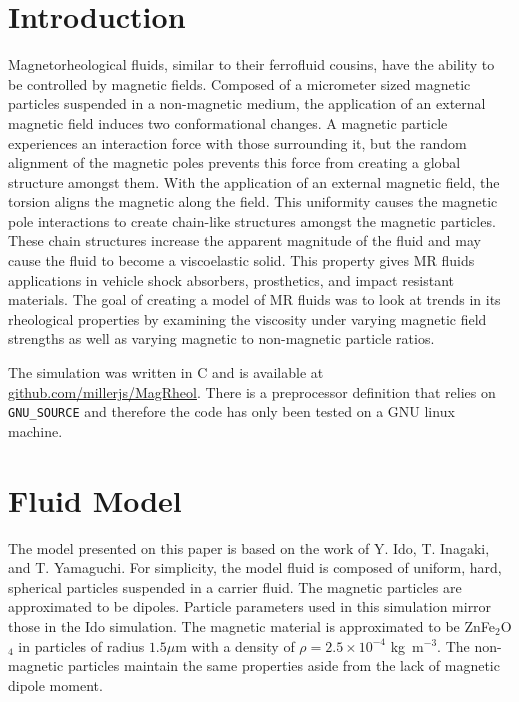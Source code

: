 \begin{multicols*}{2}

\section*{Introduction}

Magnetorheological fluids, similar to their ferrofluid cousins, have
the ability to be controlled by magnetic fields. Composed of a
micrometer sized magnetic particles suspended in a non-magnetic
medium, the application of an external magnetic field induces two
conformational changes. A magnetic particle experiences an interaction
force with those surrounding it, but the random alignment of the
magnetic poles prevents this force from creating a global structure
amongst them. With the application of an external magnetic field, the
torsion aligns the magnetic along the field.  This uniformity causes
the magnetic pole interactions to create chain-like structures amongst
the magnetic particles. These chain structures increase the apparent
magnitude of the fluid and may cause the fluid to become a
viscoelastic solid.  This property gives MR fluids applications in
vehicle shock absorbers, prosthetics, and impact resistant
materials. The goal of creating a model of MR fluids was to look at
trends in its rheological properties by examining the viscosity under
varying magnetic field strengths as well as varying magnetic to
non-magnetic particle ratios.

The simulation was written in C and is available at
\url{github.com/millerjs/MagRheol}. There is a preprocessor definition
that relies on {\tt GNU\_SOURCE} and therefore the code has only been
tested on a GNU linux machine.

\section*{Fluid Model}

The model presented on this paper is based on the work of Y. Ido,
T. Inagaki, and T. Yamaguchi\cite{1}.  For simplicity, the model fluid
is composed of uniform, hard, spherical particles suspended in a
carrier fluid.  The magnetic particles are approximated to be dipoles.
Particle parameters used in this simulation mirror those in the Ido
simulation. The magnetic material is approximated to be ZnFe$_2$O$_4$
in particles of radius $1.5 \mu$m with a density of $\rho = 2.5\times10^{-4}$
kg~m$^{-3}$. The non-magnetic particles maintain the same properties
aside from the lack of magnetic dipole moment.  


\end{multicols*}
